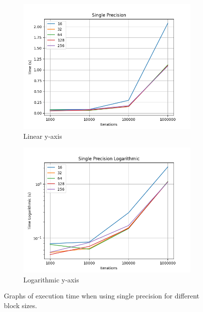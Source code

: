 \documentclass[a4paper, 12pt]{article}
\begin{document}
\begin{figure}
  \centering
  \begin{subfigure}{.5\textwidth}
    \centering
    \includegraphics[width=1\linewidth]{graphs/ex_bonus_single.png}
    \caption{Linear y-axis}
    \label{fig:ex-bonus-single-linear}
  \end{subfigure}%
  \begin{subfigure}{.5\textwidth}
    \centering
    \includegraphics[width=1\linewidth]{graphs/ex_bonus_single_log.png}
    \caption{Logarithmic y-axis}
    \label{fig:fig:ex-bonus-single-log}
  \end{subfigure}
  \caption{Graphs of execution time when using single precision for different block sizes.}
  \label{fig:fig:ex-bonus-single}
\end{figure}
\end{document}
